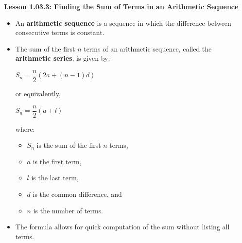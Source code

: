 \begin{center}
\textbf{Lesson 1.03.3: Finding the Sum of Terms in an Arithmetic Sequence}
\end{center}

\vspace*{-1.5ex}

\begin{itemize}
    \item An \textbf{arithmetic sequence} is a sequence in which the difference between consecutive terms is constant.
    \item The sum of the first $n$ terms of an arithmetic sequence, called the \textbf{arithmetic series}, is given by:

{\centering $ S_n = \dfrac{n}{2} (2a + (n-1)d)  $\par}
    or equivalently,

{\centering $  S_n = \dfrac{n}{2} (a + l)  $\par}
\noindent     where:
    \begin{itemize}
        \item $S_n$ is the sum of the first $n$ terms,
        \item $a$ is the first term,
        \item $l$ is the last term,
        \item $d$ is the common difference, and
        \item $n$ is the number of terms.
    \end{itemize}
    \item The formula allows for quick computation of the sum without listing all terms.
\end{itemize}
